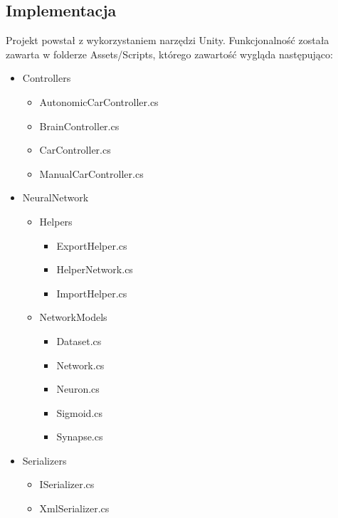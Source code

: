 \documentclass[12pt,a4paper]{article}
\begin{document}
	\subsection{Implementacja}
	Projekt powstał z wykorzystaniem narzędzi Unity. Funkcjonalność została zawarta w folderze Assets/Scripts, którego zawartość wygląda następująco:
	\begin{itemize}
	\item Controllers 
		\begin{itemize}
		\item AutonomicCarController.cs
		\item BrainController.cs
		\item CarController.cs
		\item ManualCarController.cs
		\end{itemize}
	\item NeuralNetwork
		\begin{itemize}
		\item Helpers
			\begin{itemize}
			\item ExportHelper.cs
			\item HelperNetwork.cs
			\item ImportHelper.cs
			\end{itemize}
		\item NetworkModels
			\begin{itemize}
			\item Dataset.cs
			\item Network.cs
			\item Neuron.cs
			\item Sigmoid.cs
			\item Synapse.cs
			\end{itemize}
		\end{itemize}
	\item Serializers
		\begin{itemize}
		\item ISerializer.cs
		\item XmlSerializer.cs
		\end{itemize}
	\end{itemize}
	
\end{document}
